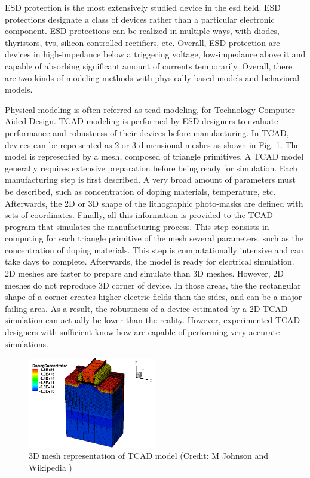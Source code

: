 %
ESD protection is the most extensively studied device in the \gls{esd} field.
ESD protections designate a class of devices rather than a particular electronic component.
ESD protections can be realized in multiple ways, with diodes, thyristors, \gls{tvs}, silicon-controlled rectifiers, etc.
Overall, ESD protection are devices in high-impedance below a triggering voltage, low-impedance above it and capable of absorbing significant amount of currents temporarily.
Overall, there are two kinds of modeling methods with physically-based models and behavioral models.

Physical modeling is often referred as \gls{tcad} modeling, for Technology Computer-Aided Design.
TCAD modeling is performed by ESD designers to evaluate performance and robustness of their devices before manufacturing.
In TCAD, devices can be represented as 2 or 3 dimensional meshes as shown in Fig. \ref{fig:esd-protection-tcad-model}.
The model is represented by a mesh, composed of triangle primitives.
A TCAD model generally requires extensive preparation before being ready for simulation.
Each manufacturing step is first described.
A very broad amount of parameters must be described, such as concentration of doping materials, temperature, etc.
Afterwards, the 2D or 3D shape of the lithographic photo-masks are defined with sets of coordinates.
Finally, all this information is provided to the TCAD program that simulates the manufacturing process.
This step consists in computing for each triangle primitive of the mesh several parameters, such as the concentration of doping materials.
This step is computationally intensive and can take days to complete.
Afterwards, the model is ready for electrical simulation.
2D meshes are faster to prepare and simulate than 3D meshes.
However, 2D meshes do not reproduce 3D corner of device.
In those areas, the the rectangular shape of a corner creates higher electric fields than the sides, and can be a major failing area.
As a result, the robustness of a device estimated by a 2D TCAD simulation can actually be lower than the reality.
However, experimented TCAD designers with sufficient know-how are capable of performing very accurate simulations.

\begin{figure}[!h]
  \centering
  \includegraphics[width=0.5\textwidth]{src/2/figures/tcad_process.png}
  \caption{3D mesh representation of TCAD model (Credit: M Johnson and Wikipedia \cite{tcad-process})}
  \label{fig:esd-protection-tcad-model}
\end{figure}

